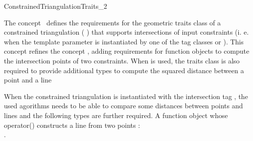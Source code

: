 

\begin{ccRefConcept}{ConstrainedTriangulationTraits_2}


\ccDefinition
  
The concept \ccRefName\ defines the requirements for the geometric
traits class of a constrained triangulation
( )
that supports intersections of input constraints (i. e.
when the template parameter  is instantiated
by one of the tag classes  or
). This concept refines the concept
, adding requirements for function objects
to compute the intersection points of two constraints.
When  is used, the 
traits class is
also required to provide  additional types
to compute the squared distance between a point and a line


\ccRefines
{} 


\ccTypes


When the constrained triangulation is instantiated with 
the intersection tag ,
the used agorithms needs to be able to compare some
distances between points and lines and the following
types are further required.
\ccGlue
{} {A function object whose operator()
constructs a line from two points : \\
.}
\ccGlue
{}



\end{ccRefConcept}
